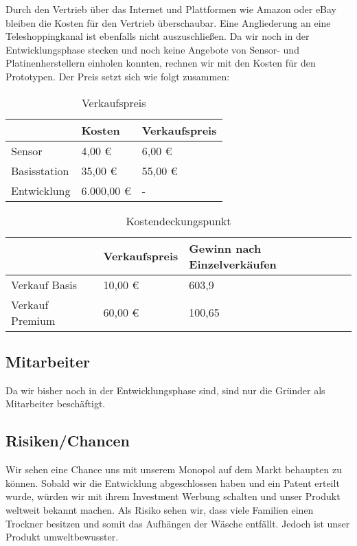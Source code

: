 			Durch den Vertrieb über das Internet und Plattformen wie Amazon oder eBay bleiben die Kosten für den Vertrieb überschaubar. Eine Angliederung an eine Teleshoppingkanal ist ebenfalls nicht auszuschließen. Da wir noch in der Entwicklungsphase stecken und noch keine Angebote von Sensor- und Platinenherstellern einholen konnten, rechnen wir mit den Kosten für den Prototypen. Der Preis setzt sich wie folgt zusammen:
\begin{table}[htbp]
  \centering
  \caption{Verkaufspreis}
    \begin{tabularx}{\textwidth}{|X|XX|}
    \toprule
    & Kosten & Verkaufspreis\\
    \midrule
    Sensor & 4,00 € & 6,00 € \\
    Basisstation & 35,00 € & 55,00 € \\
    Entwicklung & 6.000,00 € & - \\
    \bottomrule
    \end{tabularx}%
  \label{tab:addlabel}%
\end{table}%

\begin{table}[htbp]
	\centering
	\caption{Kostendeckungspunkt}
	\begin{tabularx}{\textwidth}{|X|XX|}
		\toprule
		& Verkaufspreis & Gewinn nach Einzelverkäufen \\
		\midrule
		Verkauf Basis & 10,00 € & 603,9 \\
		 Verkauf Premium & 60,00 € & 100,65 \\
		\bottomrule
	\end{tabularx}%
	\label{tab:addlabel}%
\end{table}%

\subsection{Mitarbeiter}
	Da wir bisher noch in der Entwicklungsphase sind, sind nur die Gründer als Mitarbeiter beschäftigt. 
			
\subsection{Risiken/Chancen}
	Wir sehen eine Chance uns mit unserem Monopol auf dem Markt behaupten zu können. 
	Sobald wir die Entwicklung abgeschlossen haben und ein Patent erteilt wurde, würden wir mit ihrem Investment Werbung schalten und unser Produkt weltweit bekannt machen. Als Risiko sehen wir, dass viele Familien einen Trockner besitzen und somit das Aufhängen der Wäsche entfällt. Jedoch ist unser Produkt umweltbewusster.

\addtocounter{subsection}{1}



